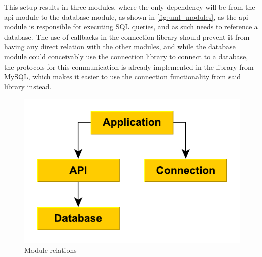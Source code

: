 This setup results in three modules, where the only dependency will be from the \ac{api} module to the database module, as shown in \autoref{fig:uml_modules}, as the \ac{api} module is responsible for executing SQL queries, and as such needs to reference a database.
The use of callbacks in the connection library should prevent it from having any direct relation with the other modules, and while the database module could conceivably use the connection library to connect to a database,
the protocols for this communication is already implemented in the library from MySQL, which makes it easier to use the connection functionality from said library instead.

\begin{figure}[ht]
\includegraphics[scale=1]{img/modules.pdf}
\caption{Module relations}
\label{fig:uml_modules}
\end{figure}